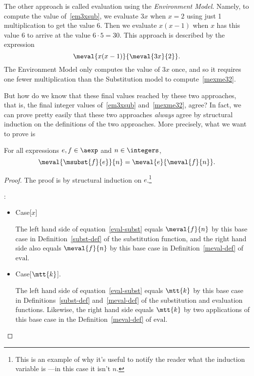 \begin{definition}
The other approach is called evaluation using the \emph{Environment
  Model}.  Namely, to compute the value of~\eqref{em3xsub},
we evaluate $3x$ when $x = 2$ using just 1 multiplication to get the value
6.  Then we evaluate $x(x-1)$ when $x$ has this value 6 to arrive at the
value $6\cdot 5=30$.  This approach is described by the expression
\begin{equation}\label{mexme32}
\meval{x(x-1)}{\meval{3x}{2}}.
\end{equation}
The Environment Model only computes the value of $3x$ once, and so
it requires one fewer multiplication than the Substitution model to
compute~\eqref{mexme32}.

But how do we know that these final values reached by these two
approaches, that is, the final integer values of~\eqref{em3xsub}
and~\eqref{mexme32}, agree?  In fact, we can prove pretty easily that
these two approaches \emph{always} agree by structural induction on
the definitions of the two approaches.  More precisely, what we want
to prove is
\begin{theorem}\label{environments}
For all expressions $e,f \in \aexp$ and $n \in \integers$,
\begin{equation}\label{eval-subst}
\meval{\msubst{f}{e}}{n} = \meval{e}{\meval{f}{n}}.
\end{equation}
\end{theorem}

\begin{proof}
The proof is by structural induction on $e$.\footnote{This is an
  example of why it's useful to notify the reader what the induction
  variable is ---in this case it isn't $n$.}

:
\begin{itemize}

\item Case[$x$]

  The left hand side of equation~\eqref{eval-subst} equals $\meval{f}{n}$
  by this base case in Definition~\ref{subst-def} of the substitution
  function, and the right hand side also equals $\meval{f}{n}$ by this base
  case in Definition~\ref{meval-def} of $\text{eval}$.

\item Case[$\mtt{k}$].

  The left hand side of equation~\eqref{eval-subst} equals $\mtt{k}$ by
  this base case in Definitions~\ref{subst-def} and~\ref{meval-def} of
  the substitution and evaluation functions.  Likewise, the right hand
  side equals $\mtt{k}$ by two applications of this base case in the
  Definition~\ref{meval-def} of $\text{eval}$.


\end{itemize}
\end{proof}
\end{definition}
